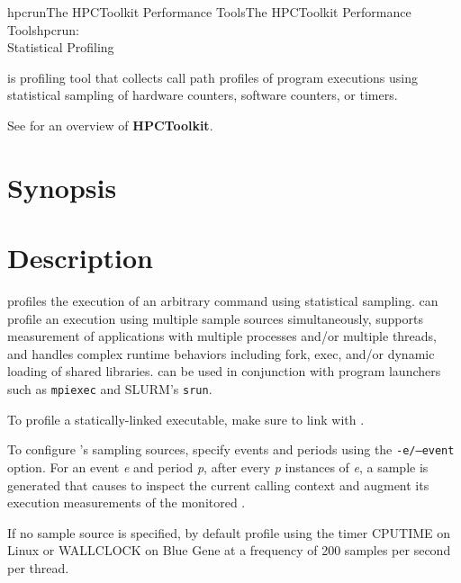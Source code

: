 \documentclass[english]{article}
\begin{document}
\begin{Name}{1}{hpcrun}{The HPCToolkit Performance Tools}{The HPCToolkit Performance Tools}{hpcrun:\\ Statistical Profiling}

 is profiling tool that collects call path profiles of program executions 
using statistical sampling of hardware counters, software counters, or timers.

See  for an overview of \textbf{HPCToolkit}.


\end{Name}

\section{Synopsis}

   

 

\section{Description}

 profiles the execution of an arbitrary command  using statistical sampling.
 can profile an execution using multiple sample sources simultaneously, 
supports measurement of applications with multiple processes and/or multiple threads, and handles complex runtime behaviors including
fork, exec, and/or dynamic loading of shared libraries.
 can be used in conjunction with program launchers such as \texttt{mpiexec} and SLURM's \texttt{srun}.

To profile a statically-linked executable, make sure to link with .

To configure 's sampling sources, specify events and periods using the \texttt{-e/--event} option.
For an event \emph{e} and period \emph{p}, after every \emph{p} instances of \emph{e}, a sample is generated that causes  to inspect the 
current calling context and augment its execution measurements of the monitored .

If no sample source is specified, by default  profile using the timer 
CPUTIME on Linux or WALLCLOCK on Blue Gene at a frequency of 200 samples per second per thread. 
\end{document}
